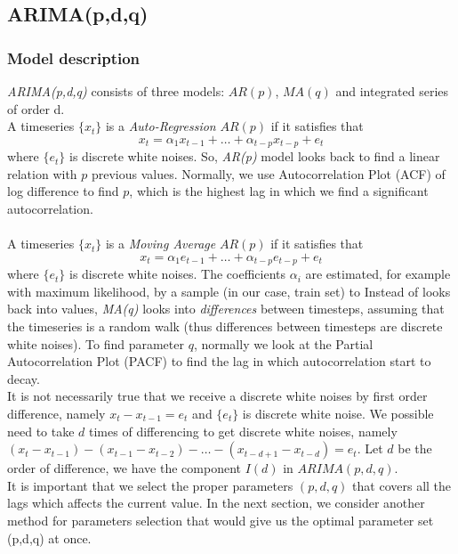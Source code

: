 \documentclass[11pt]{article}
\begin{document}
\subsection{ARIMA(p,d,q)}
\subsubsection{Model description}
\textit{ARIMA(p,d,q)} consists of three models: $AR(p)$, $MA(q)$ and integrated
series of order d.\\ 
A timeseries $\{x_t\}$ is a \textit{Auto-Regression} $AR(p)$ if it satisfies that
$$
x_t = \alpha_1x_{t-1} + \ldots + \alpha_{t-p}x_{t-p} + e_t 
$$
where $\{e_t\}$ is discrete white noises. So, \textit{AR(p)} model looks back to
find a linear relation with $p$ previous values. Normally, we use
Autocorrelation Plot (ACF) of log difference to find $p$, which is the highest
lag in which we find a significant autocorrelation.\\
\\
A timeseries $\{x_t\}$ is a \textit{Moving Average} $AR(p)$ if it satisfies that
$$
x_t = \alpha_1e_{t-1} + \ldots + \alpha_{t-p}e_{t-p} + e_t 
$$
where $\{e_t\}$ is discrete white noises. The coefficients $\alpha_i$ are
estimated, for example with maximum likelihood, by a sample (in our case, train
set) to Instead of looks back into values, \textit{MA(q)} looks into
\textit{differences} between timesteps, assuming that the timeseries is a random
walk (thus differences between timesteps are discrete white noises). To find
parameter $q$, normally we look at the Partial Autocorrelation Plot (PACF) to
find the lag in which autocorrelation start to decay.\\
It is not necessarily true that  we receive a discrete white noises by first
order difference, namely $x_t - x_{t-1}=e_t$ and $\{e_t\}$ is discrete white
noise. We possible need to take $d$ times of differencing to get discrete white
noises, namely $(x_t-x_{t-1})-(x_{t-1}-x_{t-2})-\ldots-(x_{t-d+1}-x_{t-d})=e_t$.
Let $d$ be the order of difference, we have the component $I(d)$ in
$ARIMA(p,d,q)$.\\ 

It is important that we select the proper parameters $(p,d,q)$ that covers all
the lags which affects the current value. In the next section, we consider
another method for parameters selection that would give us the optimal parameter
set (p,d,q) at once.
\end{document}
